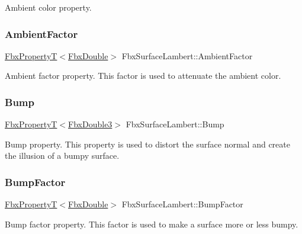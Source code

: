 Ambient color property. 

\mbox{\label{class_fbx_surface_lambert_ad23d8852b1b3ef57e73b60d43728b67c}} 
\subsubsection{\texorpdfstring{Ambient\+Factor}{AmbientFactor}}
{\footnotesize\ttfamily \hyperlink{class_fbx_property_t}{Fbx\+PropertyT}$<$\hyperlink{fbxtypes_8h_a171e72a1c46fc15c1a6c9c31948c1c5b}{Fbx\+Double}$>$ Fbx\+Surface\+Lambert\+::\+Ambient\+Factor}

Ambient factor property. This factor is used to attenuate the ambient color. \mbox{\label{class_fbx_surface_lambert_a1efc60f9887c83c861e4c428c4b6fb8d}} 
\subsubsection{\texorpdfstring{Bump}{Bump}}
{\footnotesize\ttfamily \hyperlink{class_fbx_property_t}{Fbx\+PropertyT}$<$\hyperlink{fbxtypes_8h_ae0a96f14cde566774c7553aa7523b7a7}{Fbx\+Double3}$>$ Fbx\+Surface\+Lambert\+::\+Bump}

Bump property. This property is used to distort the surface normal and create the illusion of a bumpy surface. \mbox{\label{class_fbx_surface_lambert_a23af5e6809344bdf94212955b1a3ed53}} 
\subsubsection{\texorpdfstring{Bump\+Factor}{BumpFactor}}
{\footnotesize\ttfamily \hyperlink{class_fbx_property_t}{Fbx\+PropertyT}$<$\hyperlink{fbxtypes_8h_a171e72a1c46fc15c1a6c9c31948c1c5b}{Fbx\+Double}$>$ Fbx\+Surface\+Lambert\+::\+Bump\+Factor}

Bump factor property. This factor is used to make a surface more or less bumpy. \mbox{\label{class_fbx_surface_lambert_a95f3a1ebeb92afb1e41a83088cc7e71f}} 
